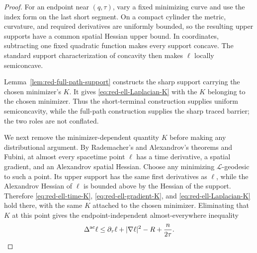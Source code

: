 \documentclass[10pt]{coll-l}
\theoremstyle{definition}
\theoremstyle{remark}
\numberwithin{section}{chapter}
\numberwithin{equation}{chapter}
\begin{document}
\begin{proof}
For an endpoint near $(q,\tau)$, vary a fixed minimizing curve and use the
index form on the last short segment.  On a compact cylinder the metric,
curvature, and required derivatives are uniformly bounded, so the resulting
upper supports have a common spatial Hessian upper bound.  In coordinates,
subtracting one fixed quadratic function makes every support concave.  The
standard support characterization of concavity then makes $\ell$ locally
semiconcave.

Lemma~\ref{lem:red-full-path-support} constructs the sharp support carrying
the chosen minimizer's $K$.  It gives
\eqref{eq:red-ell-Laplacian-K} with the $K$ belonging to the chosen
minimizer.  Thus the short-terminal construction supplies uniform
semiconcavity, while the full-path construction supplies the sharp traced
barrier; the two roles are not conflated.

We next remove the minimizer-dependent quantity $K$ before making any
distributional argument.  By Rademacher's and Alexandrov's theorems and
Fubini, at almost every spacetime point $\ell$ has a time derivative, a
spatial gradient, and an Alexandrov spatial Hessian.  Choose any minimizing
$\mathcal L$-geodesic to such a point.  Its upper support has the same first
derivatives as $\ell$, while the Alexandrov Hessian of $\ell$ is bounded
above by the Hessian of the support.  Therefore
\eqref{eq:red-ell-time-K}, \eqref{eq:red-ell-gradient-K}, and
\eqref{eq:red-ell-Laplacian-K} hold there, with the same $K$ attached to the
chosen minimizer.  Eliminating that $K$ at this point gives the
endpoint-independent almost-everywhere inequality
\begin{equation}
 \Delta^{\rm ac}\ell\leq
 \partial_\tau\ell+|\nabla\ell|^2-R+\frac n{2\tau}.
                                                               \label{eq:red-main-ae}
\end{equation}


\end{proof}
\end{document}
